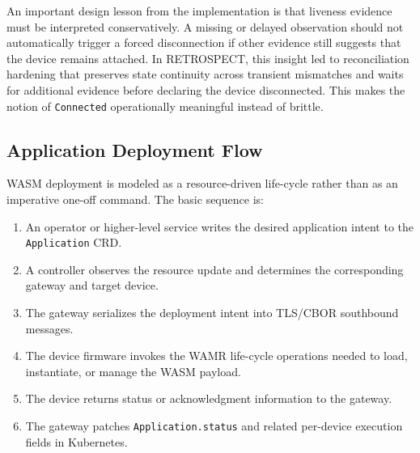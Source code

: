 An important design lesson from the implementation is that liveness evidence must be interpreted conservatively. A missing or delayed observation should not automatically trigger a forced disconnection if other evidence still suggests that the device remains attached. In RETROSPECT, this insight led to reconciliation hardening that preserves state continuity across transient mismatches and waits for additional evidence before declaring the device disconnected. This makes the notion of \texttt{Connected} operationally meaningful instead of brittle.

\subsection{Application Deployment Flow}
WASM deployment is modeled as a resource-driven life-cycle rather than as an imperative one-off command. The basic sequence is:
\begin{enumerate}
    \item An operator or higher-level service writes the desired application intent to the \texttt{Application} CRD.
    \item A controller observes the resource update and determines the corresponding gateway and target device.
    \item The gateway serializes the deployment intent into TLS/CBOR southbound messages.
    \item The device firmware invokes the WAMR life-cycle operations needed to load, instantiate, or manage the WASM payload.
    \item The device returns status or acknowledgment information to the gateway.
    \item The gateway patches \texttt{Application.status} and related per-device execution fields in Kubernetes.
\end{enumerate}

